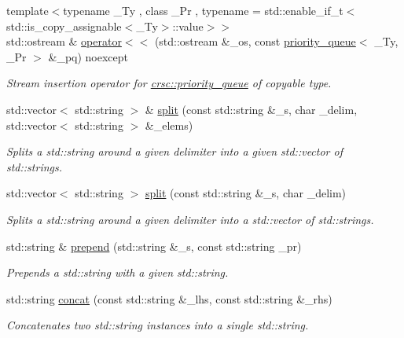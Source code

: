 \begin{DoxyCompactItemize}
{\footnotesize template$<$typename \+\_\+\+Ty , class \+\_\+\+Pr , typename  = std\+::enable\+\_\+if\+\_\+t$<$std\+::is\+\_\+copy\+\_\+assignable$<$\+\_\+\+Ty$>$\+::value$>$$>$ }\\std\+::ostream \& \hyperlink{namespacecrsc_ae77e8efaec9916e4b7bc0ec240bbc800}{operator$<$$<$} (std\+::ostream \&\+\_\+os, const \hyperlink{classcrsc_1_1priority__queue}{priority\+\_\+queue}$<$ \+\_\+\+Ty, \+\_\+\+Pr $>$ \&\+\_\+pq) noexcept
\begin{DoxyCompactList}\small\item\em Stream insertion operator for {\ttfamily \hyperlink{classcrsc_1_1priority__queue}{crsc\+::priority\+\_\+queue}} of copyable type. \end{DoxyCompactList}\item 
std\+::vector$<$ std\+::string $>$ \& \hyperlink{namespacecrsc_a5d1bf45959c8ccef7e520481d70eeb82}{split} (const std\+::string \&\+\_\+s, char \+\_\+delim, std\+::vector$<$ std\+::string $>$ \&\+\_\+elems)
\begin{DoxyCompactList}\small\item\em Splits a std\+::string around a given delimiter into a given std\+::vector of std\+::string\textquotesingle{}s. \end{DoxyCompactList}\item 
std\+::vector$<$ std\+::string $>$ \hyperlink{namespacecrsc_aae4e86239b9ae355c694d3539125f99b}{split} (const std\+::string \&\+\_\+s, char \+\_\+delim)
\begin{DoxyCompactList}\small\item\em Splits a std\+::string around a given delimiter into a std\+::vector of std\+::string\textquotesingle{}s. \end{DoxyCompactList}\item 
std\+::string \& \hyperlink{namespacecrsc_aee958a0ec9d83fc25eada38d29e82c90}{prepend} (std\+::string \&\+\_\+s, const std\+::string \+\_\+pr)
\begin{DoxyCompactList}\small\item\em Prepends a std\+::string with a given std\+::string. \end{DoxyCompactList}\item 
std\+::string \hyperlink{namespacecrsc_a305b2aff3c60b98c1a2350a68b900a23}{concat} (const std\+::string \&\+\_\+lhs, const std\+::string \&\+\_\+rhs)
\begin{DoxyCompactList}\small\item\em Concatenates two std\+::string instances into a single std\+::string. \end{DoxyCompactList}\item 

\end{DoxyCompactItemize}

